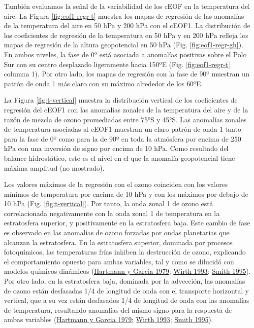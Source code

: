 \documentclass[12pt,oneside,a4paper]{reedthesis}
\begin{document}
También evaluamos la señal de la variabilidad de los cEOF en la temperatura del aire.
La Figura \ref{fig:eof1-regr-t} muestra los mapas de regresión de las anomalías de la temperatura del aire en 50 hPa y 200 hPa con el cEOF1.
La distribución de los coeficientes de regresión de la temperatura en 50 hPa y en 200 hPa refleja los mapas de regresión de la altura geopotencial en 50 hPa (Fig. \ref{fig:eof1-regr-gh}).
En ambos niveles, la fase de 0º está asociada a anomalías positivas sobre el Polo Sur con su centro desplazado ligeramente hacia 150ºE (Fig. \ref{fig:eof1-regr-t} columna 1).
Por otro lado, los mapas de regresión con la fase de 90º muestran un patrón de onda 1 más claro con su máximo alrededor de los 60ºE.

La Figura \ref{fig:t-vertical} muestra la distribución vertical de los coeficientes de regresión del cEOF1 con las anomalías zonales de la temperatura del aire y de la razón de mezcla de ozono promediadas entre 75°S y 45°S.
Las anomalías zonales de temperatura asociadas al cEOF1 muestran un claro patrón de onda 1 tanto para la fase de 0º como para la de 90º en toda la atmósfera por encima de 250 hPa con una inversión de signo por encima de 10 hPa.
Como resultado del balance hidrostático, este es el nivel en el que la anomalía geopotencial tiene máxima amplitud (no mostrado).

Los valores máximos de la regresión con el ozono coinciden con los valores mínimos de temperatura por encima de 10 hPa y con los máximos por debajo de 10 hPa (Fig. \ref{fig:t-vertical}).
Por tanto, la onda zonal 1 de ozono está correlacionada negativamente con la onda zonal 1 de temperatura en la estratosfera superior, y positivamente en la estratosfera baja.
Este cambio de fase es observado en las anomalías de ozono forzadas por ondas planetarias que alcanzan la estratosfera.
En la estratosfera superior, dominada por procesos fotoquímicos, las temperaturas frías inhiben la destrucción de ozono, explicando el comportamiento opuesto para ambas variables, tal y como se dilucidó con modelos químicos dinámicos (\protect\hyperlink{ref-hartmann1979}{Hartmann y Garcia 1979}; \protect\hyperlink{ref-wirth1993}{Wirth 1993}; \protect\hyperlink{ref-smith1995}{Smith 1995}).
Por otro lado, en la estratosfera baja, dominada por la advección, las anomalías de ozono están desfasadas 1/4 de longitud de onda con el transporte horizontal y vertical, que a su vez están desfasados 1/4 de longitud de onda con las anomalías de temperatura, resultando anomalías del mismo signo para la respuesta de ambas variables (\protect\hyperlink{ref-hartmann1979}{Hartmann y Garcia 1979}; \protect\hyperlink{ref-wirth1993}{Wirth 1993}; \protect\hyperlink{ref-smith1995}{Smith 1995}).
\end{document}
